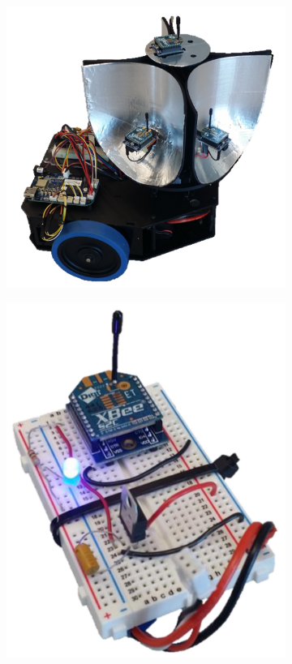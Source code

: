 \documentclass[conference]{IEEEtran}
\begin{document}
\begin{figure}[htbp]
    \centering
    \begin{subfigure}[b]{0.4\linewidth}
        \centering
        \includegraphics[width=\textwidth]{figs/img/Finalized_robot.png}
        \caption{}
        \label{fig:overallPrototype}
    \end{subfigure}
    \begin{subfigure}[b]{0.4\linewidth}
        \centering
        \includegraphics[scale=0.25]{figs/remote.pdf}

\end{subfigure}
\end{figure}
\end{document}
